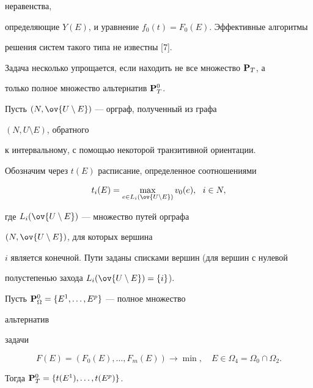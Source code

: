 неравенства, 


определяющие $Y(E)$, и уравнение $f_0(t)=F_0(E)$. Эффективные алгоритмы 


решения систем такого типа не известны [7]. 


 


Задача несколько упрощается, если находить не все множество $\bold P_T$, а 


только полное множество альтернатив $\bold P^0_T$. 


 


Пусть $(N,\ov{U\setminus E})$ --- орграф, полученный из графа 


$(N,U\setminus E)$, обратного 


к интервальному, с помощью некоторой транзитивной ориентации. 


Обозначим через $t(E)$ расписание, определенное соотношениями 


$$ 


t_i(E)=\max_{e\in L_i(\ov{U\setminus E})} 


v_0(e),\ \ i\in N, 


$$ 


где $L_i(\ov{U\setminus E})$ --- множество путей орграфа 


$(N,\ov{U\setminus E})$, для которых вершина 


$i$ является конечной. Пути заданы списками вершин (для вершин с нулевой 


полустепенью захода $L_i(\ov{U\setminus E})=\{i\}$). 


 


\begin{thm} 


Пусть $\bold P^0_\Omega=\{E^1,\dotsc,E^p\}$ --- полное множество 


альтернатив 


задачи 


\begin{equation} 


F(E)=(F_0(E),\dotsc,F_m(E))\to\min,\quad 


E\in\Omega_4=\Omega_0\cap\Omega_2. 


\end{equation} 


Тогда $\bold P^0_T=\{t(E^1),\dotsc,t(E^p)\}$. 


\end{thm} 


